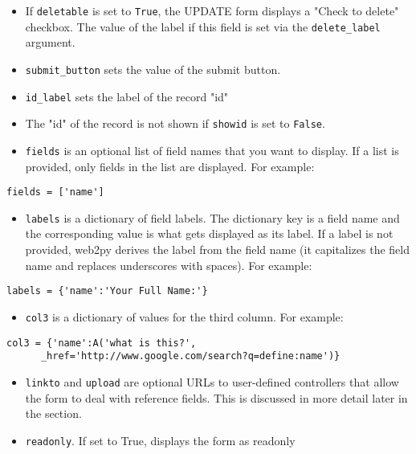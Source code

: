 \documentclass[justified,sixbynine,notoc]{tufte-book}
\def\ft{\small\tt}
\begin{document}
\begin{fullwidth}
\begin{itemize}
\item If {\ft deletable} is set to {\ft True}, the UPDATE form displays a "Check to delete" checkbox. The value of the label if this field is set via the {\ft delete\_label} argument.

\item {\ft submit\_button} sets the value of the submit button.

\item {\ft id\_label} sets the label of the record "id"

\item The "id" of the record is not shown if {\ft showid} is set to {\ft False}.

\item {\ft fields} is an optional list of field names that you want to display. If a list is provided, only fields in the list are displayed. For example:
\end{itemize}
\begin{lstlisting}
fields = ['name']
\end{lstlisting}
\begin{itemize}
\item {\ft labels} is a dictionary of field labels. The dictionary key is a field name and the corresponding value is what gets displayed as its label. If a label is not provided, web2py derives the label from the field name (it capitalizes the field name and replaces underscores with spaces). For example:
\end{itemize}
\begin{lstlisting}
labels = {'name':'Your Full Name:'}
\end{lstlisting}
\begin{itemize}
\item {\ft col3} is a dictionary of values for the third column. For example:
\end{itemize}
\begin{lstlisting}
col3 = {'name':A('what is this?',
      _href='http://www.google.com/search?q=define:name')}
\end{lstlisting}
\begin{itemize}
\item {\ft linkto} and {\ft upload} are optional URLs to user-defined controllers that allow the form to deal with reference fields. This is discussed in more detail later in the section.

\item {\ft readonly}. If set to True, displays the form as readonly


\end{itemize}
\end{fullwidth}
\end{document}
